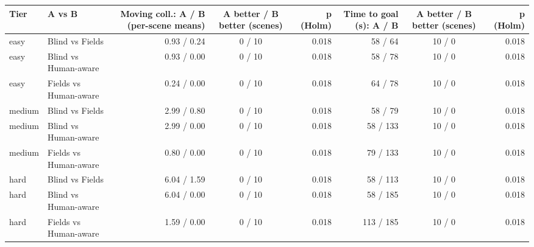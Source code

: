 \begin{tabular}{llrcrrcr}
\toprule
Tier & A vs B & Moving coll.: A / B (per-scene means) & A better / B better (scenes) & p (Holm) & Time to goal (s): A / B & A better / B better (scenes) & p (Holm) \\
\midrule
easy & Blind vs Fields & 0.93 / 0.24 & 0 / 10 & 0.018 & 58 / 64 & 10 / 0 & 0.018 \\
easy & Blind vs Human-aware & 0.93 / 0.00 & 0 / 10 & 0.018 & 58 / 78 & 10 / 0 & 0.018 \\
easy & Fields vs Human-aware & 0.24 / 0.00 & 0 / 10 & 0.018 & 64 / 78 & 10 / 0 & 0.018 \\
medium & Blind vs Fields & 2.99 / 0.80 & 0 / 10 & 0.018 & 58 / 79 & 10 / 0 & 0.018 \\
medium & Blind vs Human-aware & 2.99 / 0.00 & 0 / 10 & 0.018 & 58 / 133 & 10 / 0 & 0.018 \\
medium & Fields vs Human-aware & 0.80 / 0.00 & 0 / 10 & 0.018 & 79 / 133 & 10 / 0 & 0.018 \\
hard & Blind vs Fields & 6.04 / 1.59 & 0 / 10 & 0.018 & 58 / 113 & 10 / 0 & 0.018 \\
hard & Blind vs Human-aware & 6.04 / 0.00 & 0 / 10 & 0.018 & 58 / 185 & 10 / 0 & 0.018 \\
hard & Fields vs Human-aware & 1.59 / 0.00 & 0 / 10 & 0.018 & 113 / 185 & 10 / 0 & 0.018 \\
\bottomrule
\end{tabular}
